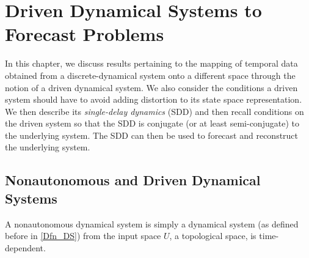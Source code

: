 \documentclass[a4paper,12pt,twoside]{book}
\begin{document}






\chapter{Driven Dynamical Systems to Forecast Problems} \label{ch4}

In this chapter, we discuss results pertaining to the mapping of temporal data obtained from a discrete-dynamical system onto a different space through the notion of a driven dynamical system. 
We also consider the conditions a driven system should have to avoid adding distortion to its state space representation. We then describe its \emph{single-delay dynamics} (SDD) and then recall conditions on the driven system so that the SDD is conjugate (or at least semi-conjugate) to the underlying system. 
The SDD can then be used to forecast and reconstruct the underlying system. 

\section{Nonautonomous and Driven Dynamical Systems}

A nonautonomous dynamical system is simply a dynamical system (as defined before in \ref{Dfn_DS})  from the input space $U$, a  topological space, is time-dependent.
\end{document}
